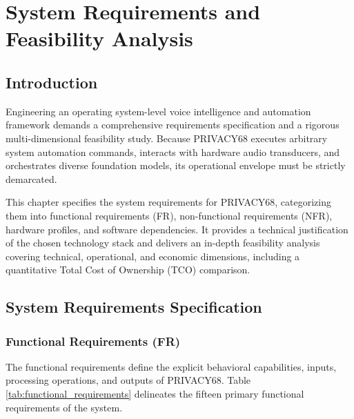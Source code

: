 \chapter{System Requirements and Feasibility Analysis}
\label{ch:requirements}

\section{Introduction}
Engineering an operating system-level voice intelligence and automation framework demands a comprehensive requirements specification and a rigorous multi-dimensional feasibility study. Because PRIVACY68 executes arbitrary system automation commands, interacts with hardware audio transducers, and orchestrates diverse foundation models, its operational envelope must be strictly demarcated. 

This chapter specifies the system requirements for PRIVACY68, categorizing them into functional requirements (FR), non-functional requirements (NFR), hardware profiles, and software dependencies. It provides a technical justification of the chosen technology stack and delivers an in-depth feasibility analysis covering technical, operational, and economic dimensions, including a quantitative Total Cost of Ownership (TCO) comparison.

\section{System Requirements Specification}

\subsection{Functional Requirements (FR)}
The functional requirements define the explicit behavioral capabilities, inputs, processing operations, and outputs of PRIVACY68. Table \ref{tab:functional_requirements} delineates the fifteen primary functional requirements of the system.

